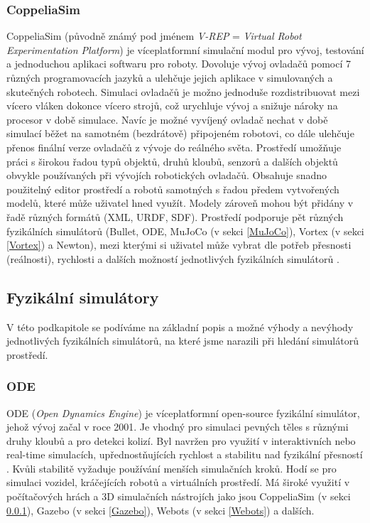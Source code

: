\subsubsection{CoppeliaSim} \label{CoppeliaSim}
CoppeliaSim \citep{coppeliaSim} \citep{coppeliarobotics} (původně známý pod
jménem \emph{V-REP} = \emph{Virtual Robot Experimentation Platform}) je
víceplatformní simulační modul pro vývoj, testování a jednoduchou aplikaci
softwaru pro roboty. Dovoluje vývoj ovladačů pomocí 7 různých programovacích
jazyků a ulehčuje jejich aplikace v simulovaných a skutečných robotech.
Simulaci ovladačů je možno jednoduše rozdistribuovat mezi vícero vláken dokonce
vícero strojů, což urychluje vývoj a snižuje nároky na procesor v době
simulace. Navíc je možné vyvíjený ovladač nechat v době simulací běžet na
samotném (bezdrátově) připojeném robotovi, co dále ulehčuje přenos finální
verze ovladačů z vývoje do reálného světa. Prostředí umožňuje práci s
širokou řadou typů objektů, druhů kloubů, senzorů a dalších objektů obvykle
používaných při vývojích robotických ovladačů. Obsahuje snadno použitelný
editor prostředí a robotů samotných s řadou předem vytvořených modelů, které
může uživatel hned využít. Modely zároveň mohou být přidány v řadě různých
formátů (XML, URDF, SDF). Prostředí podporuje pět různých fyzikálních
simulátorů (Bullet, ODE, MuJoCo (v sekci \ref{MuJoCo}), Vortex (v sekci
\ref{Vortex}) a Newton), mezi kterými si uživatel může vybrat dle potřeb
přesnosti (reálnosti), rychlosti a dalších možností jednotlivých fyzikálních
simulátorů \citep{nogueira2014comparative}.

\subsection{Fyzikální simulátory} \label{Fyzikální simulátory}

V této podkapitole se podíváme na základní popis a možné výhody a nevýhody
jednotlivých fyzikálních simulátorů, na které jsme narazili při hledání
simulátorů prostředí.

\subsubsection{ODE} \label{ODE}
ODE (\emph{Open Dynamics Engine}) \citep{opendynamicsengine} je víceplatformní
open-source fyzikální simulátor, jehož vývoj začal v roce 2001. Je vhodný pro
simulaci pevných těles s různými druhy kloubů a pro detekci kolizí. Byl navržen
pro využití v interaktivních nebo real-time simulacích, upřednostňujících
rychlost a stabilitu nad fyzikální přesností \citep{smith2007open}. Kvůli
stabilitě vyžaduje používání menších simulačních kroků. Hodí se pro simulaci
vozidel, kráčejících robotů a virtuálních prostředí. Má široké využití v
počítačových hrách a 3D simulačních nástrojích jako jsou CoppeliaSim (v sekci
\ref{CoppeliaSim}), Gazebo (v sekci \ref{Gazebo}), Webots (v sekci
\ref{Webots}) a dalších.

